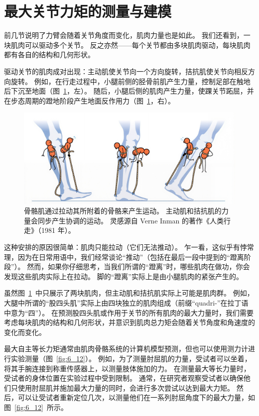 \section{最大关节力矩的测量与建模}

前几节说明了力臂会随着关节角度而变化，肌肉力量也是如此。
我们还看到，一块肌肉可以驱动多个关节。
反之亦然——每个关节都由多块肌肉驱动，每块肌肉都有各自的结构和几何形状。


驱动关节的肌肉成对出现：主动肌使关节向一个方向旋转，拮抗肌使关节向相反方向旋转。
例如，在行走过程中，小腿前侧的胫骨前肌产生力量，控制足部在触地后下沉至地面（图~\ref{fig:6_11}，左）。
随后，小腿后侧的肌肉产生力量，使踝关节跖屈，并在步态周期的蹬地阶段产生地面反作用力（图~\ref{fig:6_11}，右）。


\begin{figure}[!htb]
	\centering
	\includegraphics[width=1.0\linewidth]{chap6/6_11}
	\caption{骨骼肌通过拉动其所附着的骨骼来产生运动。
		主动肌和拮抗肌的力量会同步产生协调的运动。
		灵感源自 Verne Inman 的著作《人类行走》（1981 年）。 \label{fig:6_11}}
\end{figure}


这种安排的原因很简单：肌肉只能拉动（它们无法推动）。
乍一看，这似乎有悖常理，因为在日常用语中，我们经常谈论“推动”（包括在最后一段中提到的“蹬离阶段”）。
然而，如果你仔细思考，当我们所谓的“蹬离”时，哪些肌肉在做功，你会发现这些肌肉实际上在拉动。
脚的“蹬离”实际上是由小腿肌肉的紧张产生的。


虽然图~\ref{fig:6_11}~中只展示了两块肌肉，但主动肌和拮抗肌实际上可能是肌肉群。
例如，大腿中所谓的“股四头肌”实际上由四块独立的肌肉组成（前缀“quadri-”在拉丁语中意为“四”）。
在预测股四头肌或作用于关节的所有肌肉的最大力量时，我们需要考虑每块肌肉的结构和几何形状，并意识到肌肉总力矩会随着关节角度和角速度的变化而变化。


最大自主等长力矩通常由肌肉骨骼系统的计算机模型预测，但也可以使用测力计进行实验测量（图~\ref{fig:6_12}）。
例如，为了测量肘屈肌的力量，受试者可以坐着，将其手腕连接到称重传感器上，以测量肢体施加的力。
在测量最大等长力量时，受试者的身体位置在实验过程中受到限制。
通常，在研究者观察受试者以确保他们只使用肘屈肌并施加最大力量的同时，会进行多次尝试以达到最大力矩。
然后，可以让受试者重新定位几次，以测量他们在一系列肘屈角度下的最大力量，如图~\ref{fig:6_12}~所示。


